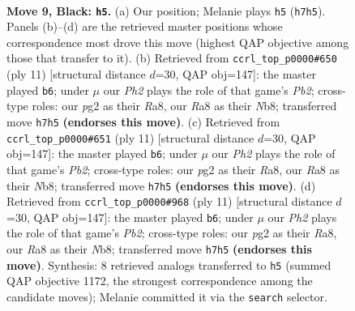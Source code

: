 \documentclass[11pt]{article}
\begin{document}
\clearpage

\begin{figure}[p]\centering
\begin{subfigure}{0.46\textwidth}\centering
\resizebox{\linewidth}{!}{%
\newchessgame
\chessboard[
  setfen={rnbq1rk1/p4ppp/1p2pn2/3p4/PbPP3P/2NB1N2/1P3PP1/R1BQK2R b KQ - 0 9},
  showmover=false,
  pgfstyle=straightmove, color=movearrow, markmove={h7-h5}
]}
\caption{}
\end{subfigure}\hfill
\begin{subfigure}{0.46\textwidth}\centering
\resizebox{\linewidth}{!}{%
\newchessgame
\chessboard[
  setfen={rnbq1rk1/ppp2ppp/4pn2/3p4/1bPP4/2NBPN2/PP3PPP/R1BQK2R b KQ - 2 6},
  showmover=false,
  pgfstyle=straightmove, color=movearrow, markmove={b7-b6}
]}
\caption{}
\end{subfigure}
\\[4pt]
\begin{subfigure}{0.46\textwidth}\centering
\resizebox{\linewidth}{!}{%
\newchessgame
\chessboard[
  setfen={rnbq1rk1/ppp2ppp/4pn2/3p4/1bPP4/2NBPN2/PP3PPP/R1BQK2R b KQ - 2 6},
  showmover=false,
  pgfstyle=straightmove, color=movearrow, markmove={b7-b6}
]}
\caption{}
\end{subfigure}\hfill
\begin{subfigure}{0.46\textwidth}\centering
\resizebox{\linewidth}{!}{%
\newchessgame
\chessboard[
  setfen={rnbq1rk1/ppp2ppp/4pn2/3p4/1bPP4/2NBPN2/PP3PPP/R1BQK2R b KQ - 1 6},
  showmover=false,
  pgfstyle=straightmove, color=movearrow, markmove={b7-b6}
]}
\caption{}
\end{subfigure}
\caption{\textbf{Move 9, Black: \texttt{h5}.} (a) Our position; Melanie plays \texttt{h5} (\texttt{h7h5}). Panels (b)--(d) are the retrieved master positions whose correspondence most drove this move (highest QAP objective among those that transfer to it). (b) Retrieved from \texttt{ccrl\_top\_p0000\#650} (ply 11) [structural distance $d$=30, QAP obj=147]: the master played \texttt{b6}; under $\mu$ our \emph{Ph2} plays the role of that game's \emph{Pb2}; cross-type roles: our \emph{p}g2 as their \emph{R}a8, our \emph{R}a8 as their \emph{N}b8; transferred move \texttt{h7h5} \textbf{(endorses this move)}. (c) Retrieved from \texttt{ccrl\_top\_p0000\#651} (ply 11) [structural distance $d$=30, QAP obj=147]: the master played \texttt{b6}; under $\mu$ our \emph{Ph2} plays the role of that game's \emph{Pb2}; cross-type roles: our \emph{p}g2 as their \emph{R}a8, our \emph{R}a8 as their \emph{N}b8; transferred move \texttt{h7h5} \textbf{(endorses this move)}. (d) Retrieved from \texttt{ccrl\_top\_p0000\#968} (ply 11) [structural distance $d$=30, QAP obj=147]: the master played \texttt{b6}; under $\mu$ our \emph{Ph2} plays the role of that game's \emph{Pb2}; cross-type roles: our \emph{p}g2 as their \emph{R}a8, our \emph{R}a8 as their \emph{N}b8; transferred move \texttt{h7h5} \textbf{(endorses this move)}. Synthesis: 8 retrieved analogs transferred to \texttt{h5} (summed QAP objective 1172, the strongest correspondence among the candidate moves); Melanie committed it via the \texttt{search} selector.}
\label{fig:thought-m17}
\end{figure}
\end{document}
